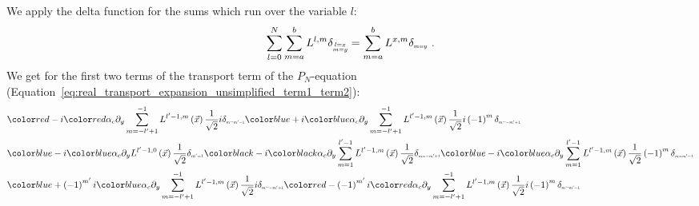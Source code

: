 \documentclass{egpubl}
\makeatletter
\newcommand{\ud}{\,\mathrm{d}} %
\def\mathcolor#1#{\@mathcolor{#1}}
\def\@mathcolor#1#2#3{%
  \protect\leavevmode
  \begingroup\color#1{#2}#3\endgroup
}
\makeatother
\begin{document}
We apply the delta function for the sums which run over the variable $l$:
\begin{align}
\sum_{l=0}^{N}\sum_{m=a}^{b}L^{l,m}\delta_{\scaleto{\substack{l=x\\m=y}}{9pt}}=\sum_{m=a}^{b}L^{x,m}\delta_{\scaleto{m=y}{3pt}} \ .
\end{align}
We get for the first two terms of the transport term of the $P_N$-equation (Equation~\ref{eq:real_transport_expansion_unsimplified_term1_term2}):
\begin{align*}
&
\mathcolor{red}{-i}
\mathcolor{red}{\alpha_c\partial_y
\sum_{m=-l'+1}^{-1}L^{l'-1,m}\left (\vec{x}\right)
\frac{1}{\sqrt{2}}
i\delta_{\scaleto{m=m'-1}{4pt}}
}
\mathcolor{blue}{
+i
}
\mathcolor{blue}{
\alpha_c\partial_y
\sum_{m=-l'+1}^{-1}L^{l'-1,m}\left (\vec{x}\right)
\frac{1}{\sqrt{2}}
i
\left({-1}\right)^{m}
\delta_{\scaleto{m=-m'+1}{4pt}}
}
\\&
\mathcolor{blue}
{
-i
}
\mathcolor{blue}
{
\alpha_c\partial_y
L^{l'-1,0}\left (\vec{x}\right)
\frac{1}{\sqrt{2}}
\delta_{\scaleto{m'=1}{4pt}}
}
\mathcolor{black}
{
-i
}
\mathcolor{black}
{
\alpha_c\partial_y
\sum_{m=1}^{l'-1}L^{l'-1,m}\left (\vec{x}\right)
\frac{1}{\sqrt{2}}
\delta_{\scaleto{m=-m'+1}{4pt}}
}
\mathcolor{blue}
{
-i
}
\mathcolor{blue}
{
\alpha_c\partial_y
\sum_{m=1}^{l'-1}L^{l'-1,m}\left (\vec{x}\right)
\frac{1}{\sqrt{2}}
\left({-1}\right)^{m}
\delta_{\scaleto{m=m'-1}{4pt}}
}
\\&
\mathcolor{blue}
{
+\left({-1}\right)^{m'}i
}
\mathcolor{blue}{
\alpha_c\partial_y
\sum_{m=-l'+1}^{-1}L^{l'-1,m}\left (\vec{x}\right)
\frac{1}{\sqrt{2}}
i
\delta_{\scaleto{m=-m'+1}{4pt}}
}
\mathcolor{red}
{
-\left({-1}\right)^{m'}i
}
\mathcolor{red}
{
\alpha_c\partial_y
\sum_{m=-l'+1}^{-1}L^{l'-1,m}\left (\vec{x}\right)
\frac{1}{\sqrt{2}}
i
\left({-1}\right)^{m}
\delta_{\scaleto{m=m'-1}{4pt}}
}
\\&

\end{align*}
\end{document}
